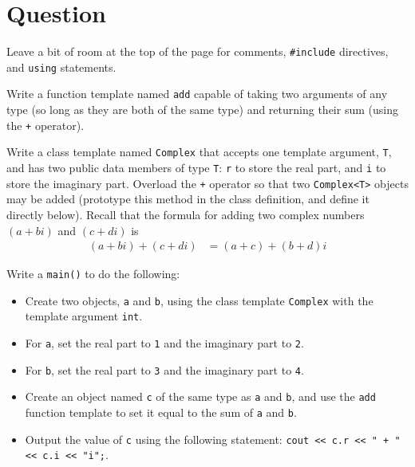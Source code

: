 \newEvenPage

\section{Question}

Leave a bit of room at the top of the page for comments,
\texttt{#include} directives, and \texttt{using} statements.

Write a function template named \texttt{add} capable of taking two
arguments of any type (so long as they are both of the same type) and returning
their sum (using the \texttt{+} operator).

Write a class template named \texttt{Complex} that accepts one
template argument, \texttt{T}, and has two public data members of type
\texttt{T}: \texttt{r} to store the real part, and
\texttt{i} to store the imaginary part.  Overload the
\texttt{+} operator so that two \texttt{Complex<T>} objects
may be added (prototype this method in the class definition, and define it
directly below).  Recall that the formula for adding two complex numbers
$(a+bi)$ and $(c+di)$ is
\begin{align*}
  (a+bi)+(c+di) &= (a+c) + (b+d)i
\end{align*}

Write a \texttt{main()} to do the following:
\begin{itemize}
  \item Create two objects, \texttt{a} and \texttt{b}, using
    the class template \texttt{Complex} with the template argument
    \texttt{int}.
  \item For \texttt{a}, set the real part to \texttt{1} and
    the imaginary part to \texttt{2}.
  \item For \texttt{b}, set the real part to \texttt{3} and
    the imaginary part to \texttt{4}.
  \item Create an object named \texttt{c} of the same type as
    \texttt{a} and \texttt{b}, and use the
    \texttt{add} function template to set it equal to the sum of
    \texttt{a} and \texttt{b}.
  \item Output the value of \texttt{c} using the following statement:
    \texttt{cout << c.r << " + " << c.i << "i\n";}.
\end{itemize}

\newOddPage
\textQuestion{\makePageQuadrilleRuled}

\newOddPage
\textQuestion{\makePageQuadrilleRuled}
\textAnswer{~}

\newpage

